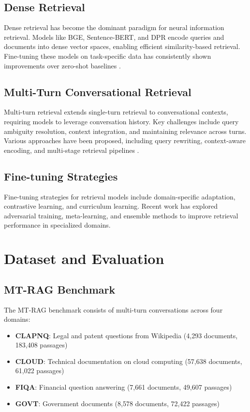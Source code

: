 \documentclass[conference]{IEEEtran}
\begin{document}
\subsection{Dense Retrieval}
Dense retrieval has become the dominant paradigm for neural information retrieval. Models like BGE, Sentence-BERT, and DPR encode queries and documents into dense vector spaces, enabling efficient similarity-based retrieval. Fine-tuning these models on task-specific data has consistently shown improvements over zero-shot baselines \cite{liu2023bge}.

\subsection{Multi-Turn Conversational Retrieval}
Multi-turn retrieval extends single-turn retrieval to conversational contexts, requiring models to leverage conversation history. Key challenges include query ambiguity resolution, context integration, and maintaining relevance across turns. Various approaches have been proposed, including query rewriting, context-aware encoding, and multi-stage retrieval pipelines \cite{katsis2024mtrag}.

\subsection{Fine-tuning Strategies}
Fine-tuning strategies for retrieval models include domain-specific adaptation, contrastive learning, and curriculum learning. Recent work has explored adversarial training, meta-learning, and ensemble methods to improve retrieval performance in specialized domains.

\section{Dataset and Evaluation}

\subsection{MT-RAG Benchmark}
The MT-RAG benchmark consists of multi-turn conversations across four domains:
\begin{itemize}
    \item \textbf{CLAPNQ}: Legal and patent questions from Wikipedia (4,293 documents, 183,408 passages)
    \item \textbf{CLOUD}: Technical documentation on cloud computing (57,638 documents, 61,022 passages)
    \item \textbf{FIQA}: Financial question answering (7,661 documents, 49,607 passages)
    \item \textbf{GOVT}: Government documents (8,578 documents, 72,422 passages)
\end{itemize}
\end{document}
